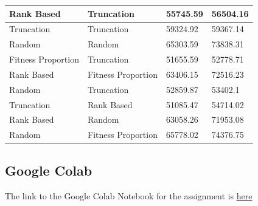 \documentclass[11pt, letterpaper]{article}
\begin{document}
\begin{table}[H]
\begin{tabular}{|l|l|l|l|}
        Rank Based & Truncation & 55745.59 & 56504.16 \\ \hline
        Truncation & Truncation & 59324.92 & 59367.14 \\ \hline
        Random & Random & 65303.59 & 73838.31 \\ \hline
        Fitness Proportion & Truncation & 51655.59 & 52778.71 \\ \hline
        Rank Based & Fitness Proportion & 63406.15 & 72516.23 \\ \hline
        Random & Truncation & 52859.87 & 53402.1 \\ \hline
        Truncation & Rank Based & 51085.47 & 54714.02 \\ \hline
        Rank Based & Random & 63058.26 & 71953.08 \\ \hline
        Random & Fitness Proportion & 65778.02 & 74376.75 \\ \hline
    \end{tabular}
\end{table}

\newpage
\subsection {Google Colab}
The link to the Google Colab Notebook for the assignment is \href{https://colab.research.google.com/drive/1AgRRDJZLwOUPDDmhBcisCZp-pijTVeMK?usp=sharing}{here}
\end{document}
